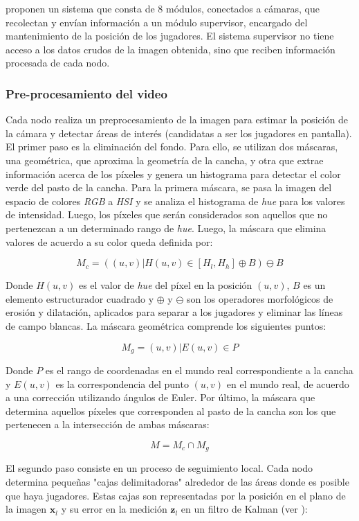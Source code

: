 \documentclass[a4paper,10pt]{article}
\begin{document}
\citeauthor*{xu-8cams} proponen un sistema que consta de 8 módulos, conectados
a cámaras, que recolectan y envían información
a un módulo supervisor, encargado del mantenimiento de la posición de los
jugadores. El sistema supervisor no tiene acceso a los datos crudos de la
imagen obtenida, sino que reciben información procesada de cada nodo.

\subsubsection{Pre-procesamiento del video}

Cada nodo realiza un preprocesamiento de la imagen para estimar la posición
de la cámara y detectar áreas de interés (candidatas a ser los jugadores en
pantalla). El primer paso es la eliminación del fondo. Para ello, se utilizan dos máscaras,
una geométrica, que aproxima la geometría de la cancha, y otra que extrae
información acerca de los píxeles y genera un histograma para detectar el color
verde del pasto de la cancha. Para la primera máscara, se pasa la imagen del
espacio de colores
\textit{RGB} a \textit{HSI} y se analiza el histograma de \textit{hue} para los
valores de intensidad. Luego, los píxeles que serán considerados son
aquellos que no pertenezcan a un determinado rango de \textit{hue}.
Luego, la máscara que elimina valores de acuerdo a su color queda definida por:

\[
  M_c = ({(u, v) | H(u, v) \in [H_l, H_h]} \oplus B ) \ominus B
\]

Donde $H(u, v)$ es el valor de \textit{hue} del píxel en la posición $(u, v)$,
$B$ es un elemento estructurador cuadrado y $\oplus$ y $\ominus$ son los
operadores morfológicos de erosión y dilatación, aplicados para separar a los
jugadores y eliminar las líneas de campo blancas. La máscara geométrica
comprende los siguientes puntos:

\[
  M_g = { (u, v) | E(u, v)  \in P }
\]

Donde $P$ es el rango de coordenadas en el mundo real correspondiente a la cancha
y $E(u, v)$ es la correspondencia del punto $(u, v)$ en el mundo real, de
acuerdo a una corrección utilizando ángulos de Euler. Por último, la máscara que
determina aquellos píxeles que corresponden al pasto de la cancha son los que
pertenecen a la intersección de ambas máscaras:

\[
  M = M_c \cap M_g
\]

El segundo paso consiste en un proceso de seguimiento local. Cada nodo
determina pequeñas "cajas delimitadoras" alrededor de las áreas donde
es posible que haya jugadores. Estas cajas son
representadas por la posición en el plano de la imagen $\mathbf{x}_l$ y su
error en la medición $\mathbf{z}_l$ en un filtro de Kalman (ver \cite{funk2003study}):
\end{document}
